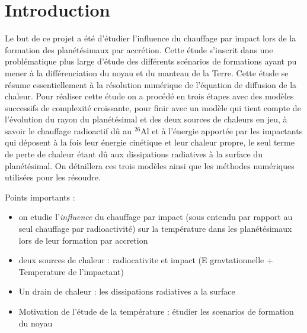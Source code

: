 \documentclass[10pt,a4paper]{article}
\numberwithin{equation}{section}
\begin{document}
\setcounter{page}{1}




\section*{Introduction}

Le but de ce  projet a été d'étudier l'influence du chauffage par impact lors de la formation des planétésimaux par accrétion. Cette étude s'inscrit dans une problématique plus large d'étude des différents scénarios de formations ayant pu mener à la différenciation du noyau et du manteau de la Terre. Cette étude se résume essentiellement à la résolution numérique de l'équation de diffusion de la chaleur.
Pour réaliser cette étude on a procédé en trois étapes avec des modèles successifs de complexité croissante, pour finir avec un modèle qui tient compte de l'évolution du rayon du planétésimal et des deux sources de chaleurs en jeu, à savoir le chauffage radioactif dû au $^{26}$Al et à l'énergie apportée par les impactants qui déposent à la fois leur énergie cinétique et leur chaleur propre, le seul terme de perte de chaleur étant dû aux dissipations radiatives à la surface du planétésimal. On détaillera ces trois modèles ainsi que les méthodes numériques utilisées pour les résoudre.


Points importants :
\begin{itemize}
\item on etudie l'\textit{influence} du chauffage par impact (sous entendu par rapport au seul chauffage par radioactivité) sur la température dans les planétésimaux lors de leur formation par accretion
\item deux sources de chaleur : radiocativite et impact (E gravtationnelle + Temperature de l'impactant)
\item Un drain  de chaleur : les dissipations radiatives a la surface
\item Motivation de l'étude de la température : étudier les scenarios de formation du noyau
\end{itemize}
\newpage
\end{document}
